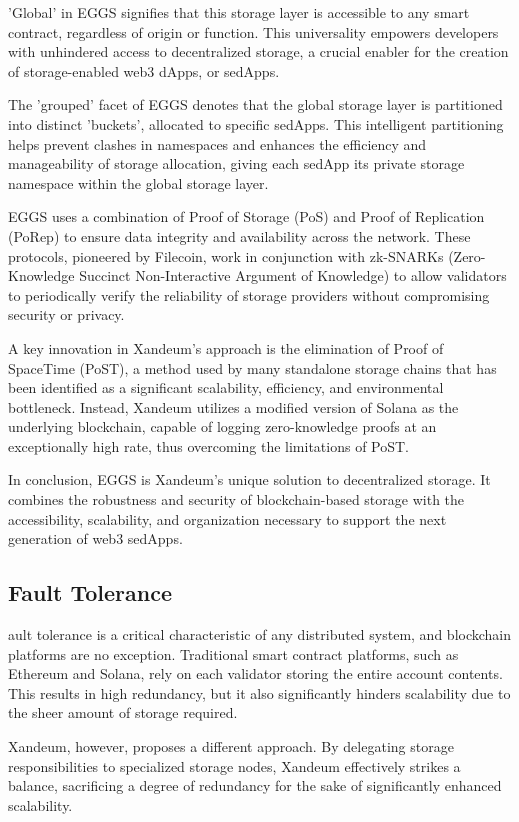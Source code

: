 \documentclass[11 pt]{article}   	%
\begin{document}
'Global' in EGGS signifies that this storage layer is accessible to any smart contract, regardless of origin or function. This universality empowers developers with unhindered access to decentralized storage, a crucial enabler for the creation of storage-enabled web3 dApps, or sedApps.

The 'grouped' facet of EGGS denotes that the global storage layer is partitioned into distinct 'buckets', allocated to specific sedApps. This intelligent partitioning helps prevent clashes in namespaces and enhances the efficiency and manageability of storage allocation, giving each sedApp its private storage namespace within the global storage layer.

EGGS uses a combination of Proof of Storage (PoS) and Proof of Replication (PoRep) to ensure data integrity and availability across the network. These protocols, pioneered by Filecoin, work in conjunction with zk-SNARKs (Zero-Knowledge Succinct Non-Interactive Argument of Knowledge) \cite{leastauth21} to allow validators to periodically verify the reliability of storage providers without compromising security or privacy.

A key innovation in Xandeum's approach is the elimination of Proof of SpaceTime (PoST), a method used by many standalone storage chains that has been identified as a significant scalability, efficiency, and environmental bottleneck. Instead, Xandeum utilizes a modified version of Solana as the underlying blockchain, capable of logging zero-knowledge proofs at an exceptionally high rate, thus overcoming the limitations of PoST.

In conclusion, EGGS is Xandeum's unique solution to decentralized storage. It combines the robustness and security of blockchain-based storage with the accessibility, scalability, and organization necessary to support the next generation of web3 sedApps.

\subsection{Fault Tolerance}
ault tolerance is a critical characteristic of any distributed system, and blockchain platforms are no exception. Traditional smart contract platforms, such as Ethereum and Solana, rely on each validator storing the entire account contents. This results in high redundancy, but it also significantly hinders scalability due to the sheer amount of storage required.

Xandeum, however, proposes a different approach. By delegating storage responsibilities to specialized storage nodes, Xandeum effectively strikes a balance, sacrificing a degree of redundancy for the sake of significantly enhanced scalability.
\end{document}
